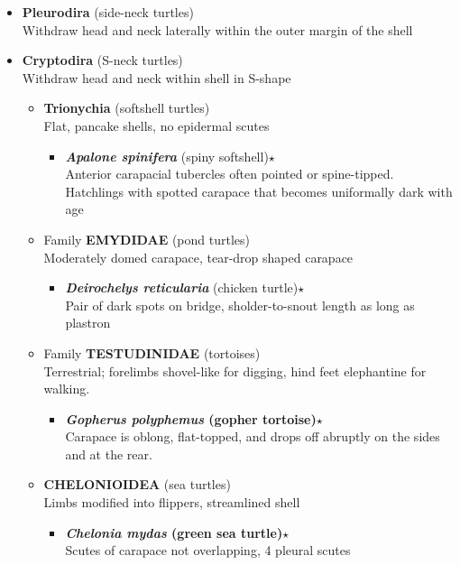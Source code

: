 \documentclass[a4paper,12pt]{article}
\begin{document}
\begin{description}
\begin{itemize}
  \item{\textbf{Pleurodira} (side-neck turtles)} \\ Withdraw head and neck laterally within the outer margin of the shell
  \item{\textbf{Cryptodira} (S-neck turtles)} \\ Withdraw head and neck within shell in S-shape
  \begin{itemize}
    \item {\textbf{Trionychia} (softshell turtles)} \\ Flat, pancake shells, no epidermal scutes
    \begin{itemize}
      \item{\textbf{\textit{Apalone spinifera}} (spiny softshell)$\star$} \\ Anterior carapacial tubercles often pointed or spine-tipped. Hatchlings with spotted carapace that becomes uniformally dark with age
    \end{itemize}
    \item Family {\textbf{EMYDIDAE} (pond turtles)} \\ Moderately domed carapace, tear-drop shaped carapace
    \begin{itemize}
      \item{\textbf{\textit{Deirochelys reticularia}} (chicken turtle)$\star$} \\ Pair of dark spots on bridge, sholder-to-snout length as long as plastron
    \end{itemize}
    \item Family {\textbf{TESTUDINIDAE} (tortoises)} \\ Terrestrial; forelimbs shovel-like for digging, hind feet elephantine for walking.
    \begin{itemize}
      \item{\textbf{\textit{Gopherus polyphemus} (gopher tortoise)$\star$}} \\ Carapace is oblong, flat-topped, and drops off abruptly on the sides and at the rear.
    \end{itemize}
    \item {\textbf{CHELONIOIDEA} (sea turtles)} \\ Limbs modified into flippers, streamlined shell
    \begin{itemize}
      \item{\textbf{\textit{Chelonia mydas} (green sea turtle)$\star$}} \\ Scutes of carapace not overlapping, 4 pleural scutes

\end{itemize}
\end{itemize}
\end{itemize}
\end{description}
\end{document}
